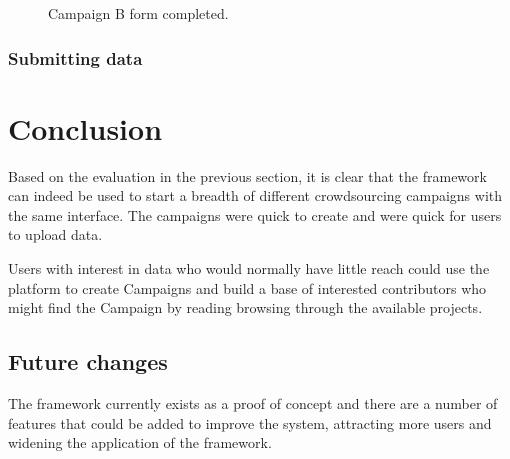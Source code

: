 \documentclass{article}
\newcommand\ssection{\clearpage\section}
\begin{document}
		\begin{figure}[H]
			\centering
			\caption{Campaign B form completed.}
			\label{fig:eval-cb-1}
		\end{figure}

		\subsubsection{Submitting data}

		\FloatBarrier


	\ssection{Conclusion}
	\label{sec:conclusion}

		Based on the evaluation in the previous section, it is clear that the framework can indeed be used to start a breadth of different crowdsourcing campaigns with the same interface. The campaigns were quick to create and were quick for users to upload data.

		Users with interest in data who would normally have little reach could use the platform to create Campaigns and build a base of interested contributors who might find the Campaign by reading browsing through the available projects.

		\subsection{Future changes}

		The framework currently exists as a proof of concept and there are a number of features that could be added to improve the system, attracting more users and widening the application of the framework.
\end{document}
